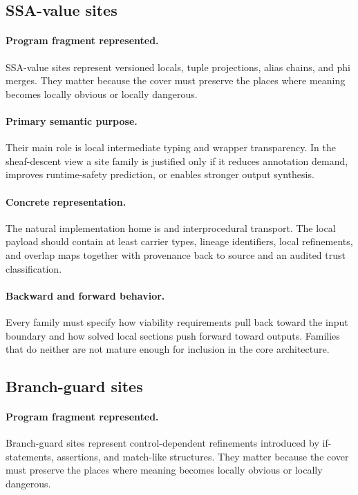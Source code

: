 \documentclass[11pt]{report}
\DeclareRobustCommand{\py}[1]{\texttt{\detokenize{#1}}}
\theoremstyle{definition}
\theoremstyle{plain}
\begin{document}
\subsection{SSA-value sites}

\paragraph{Program fragment represented.}
SSA-value sites represent versioned locals, tuple projections, alias chains, and phi merges. They matter because the cover must preserve the
places where meaning becomes locally obvious or locally dangerous.

\paragraph{Primary semantic purpose.}
Their main role is local intermediate typing and wrapper transparency. In the sheaf-descent view a site family is
justified only if it reduces annotation demand, improves runtime-safety
prediction, or enables stronger output synthesis.

\paragraph{Concrete representation.}
The natural implementation home is \py{surface/python_ssa.py} and interprocedural transport. The local payload should contain
at least carrier types, lineage identifiers, local refinements, and overlap maps together with provenance back to source and an audited
trust classification.

\paragraph{Backward and forward behavior.}
Every family must specify how viability requirements pull back toward the
input boundary and how solved local sections push forward toward outputs.
Families that do neither are not mature enough for inclusion in the core
architecture.

\subsection{Branch-guard sites}

\paragraph{Program fragment represented.}
Branch-guard sites represent control-dependent refinements introduced by if-statements, assertions, and match-like structures. They matter because the cover must preserve the
places where meaning becomes locally obvious or locally dangerous.
\end{document}
